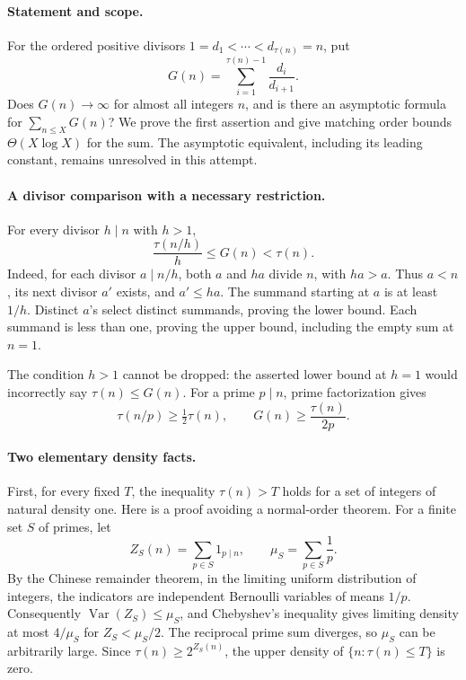 \paragraph{Statement and scope.}
For the ordered positive divisors \(1=d_1<\cdots<d_{\tau(n)}=n\), put
\[
 G(n)=\sum_{i=1}^{\tau(n)-1}\frac{d_i}{d_{i+1}}.
\]
Does \(G(n)\to\infty\) for almost all integers \(n\), and is there an asymptotic formula for \(\sum_{n\leq X}G(n)\)? We prove the first assertion and give matching order bounds \(\Theta(X\log X)\) for the sum. The asymptotic equivalent, including its leading constant, remains unresolved in this attempt.

\paragraph{A divisor comparison with a necessary restriction.}
For every divisor \(h\mid n\) with \(h>1\),
\[
 \frac{\tau(n/h)}h\leq G(n)<\tau(n). \tag{1}
\]
Indeed, for each divisor \(a\mid n/h\), both \(a\) and \(ha\) divide \(n\), with \(ha>a\). Thus \(a<n\), its next divisor \(a'\) exists, and \(a'\leq ha\). The summand starting at \(a\) is at least \(1/h\). Distinct \(a\)'s select distinct summands, proving the lower bound. Each summand is less than one, proving the upper bound, including the empty sum at \(n=1\).

The condition \(h>1\) cannot be dropped: the asserted lower bound at \(h=1\) would incorrectly say \(\tau(n)\leq G(n)\). For a prime \(p\mid n\), prime factorization gives
\[
 \tau(n/p)\geq\tfrac12\tau(n),\qquad
 G(n)\geq\frac{\tau(n)}{2p}. \tag{2}
\]

\paragraph{Two elementary density facts.}
First, for every fixed \(T\), the inequality \(\tau(n)>T\) holds for a set of integers of natural density one. Here is a proof avoiding a normal-order theorem. For a finite set \(S\) of primes, let
\[
 Z_S(n)=\sum_{p\in S}1_{p\mid n},\qquad \mu_S=\sum_{p\in S}\frac1p.
\]
By the Chinese remainder theorem, in the limiting uniform distribution of integers, the indicators are independent Bernoulli variables of means \(1/p\). Consequently \(\operatorname{Var}(Z_S)\leq\mu_S\), and Chebyshev's inequality gives limiting density at most \(4/\mu_S\) for \(Z_S<\mu_S/2\). The reciprocal prime sum diverges, so \(\mu_S\) can be arbitrarily large. Since \(\tau(n)\geq2^{Z_S(n)}\), the upper density of \(\{n:\tau(n)\leq T\}\) is zero.

